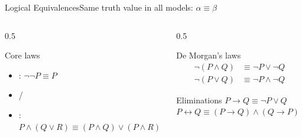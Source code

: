 \documentclass[aspectratio=169,11pt]{beamer}
\begin{document}
\begin{frame}{Logical Equivalences}{Same truth value in all models: $\alpha \equiv \beta$}
  \begin{columns}[T]
    \begin{column}{0.5\textwidth}
      \small
      \begin{block}{Core laws}
        \begin{itemize}\small
          \item {}: $\neg\neg P \equiv P$
          \item {} / 
          \item {}: \\
            $P \land (Q \lor R) \equiv (P\land Q)\lor(P\land R)$
        \end{itemize}
      \end{block}
    \end{column}
    \begin{column}{0.5\textwidth}
      \small
      \begin{exampleblock}{De Morgan's laws}
        \begin{align*}
          \neg(P \land Q) &\equiv \neg P \lor \neg Q \\
          \neg(P \lor Q)  &\equiv \neg P \land \neg Q
        \end{align*}
      \end{exampleblock}
      \begin{block}{Eliminations}
        \small
        $P \rightarrow Q \equiv \neg P \lor Q$ \\
        $P \leftrightarrow Q \equiv (P\rightarrow Q)\land(Q\rightarrow P)$
      \end{block}
    \end{column}
  \end{columns}
\end{frame}
\end{document}
